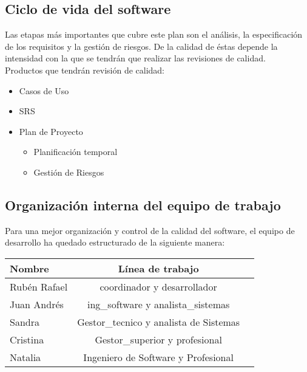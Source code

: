 \documentclass[11pt, a4paper, twoside, titlepage]{article}
\begin{document}
		\subsection{Ciclo de vida del software} %
			Las etapas más importantes que cubre este plan son el análisis, la especificación de los requisitos y la gestión de riesgos. De la calidad de éstas depende la intensidad con la que se tendrán que realizar las revisiones de calidad. %
 \\

			Productos que tendrán revisión de calidad: \\

				\begin{itemize}
					\item Casos de Uso
					\item SRS
					\item Plan de Proyecto
						\begin{itemize}
							\item Planificación temporal
							\item Gestión de Riesgos
						\end{itemize}
				\end{itemize}
				
		\subsection{Organización interna del equipo de trabajo}
			Para una mejor organización y control de la calidad del software, el equipo de desarrollo ha quedado estructurado de la siguiente manera:
			
			\begin{center}
				\begin{tabular}{| l | c | r |}
				\hline
				\bfseries Nombre 	& \bfseries Línea de trabajo			\\ \hline
				Rubén Rafael 		& \gls{coordinador} y \gls{desarrollador} 	\\ \hline
				Juan Andrés 		& \gls{ing_software} y \gls{analista_sistemas}	\\ \hline
				Sandra 			& \gls{Gestor_tecnico} y analista de Sistemas	\\ \hline
				Cristina 		& \gls{Gestor_superior} y \gls{profesional}	\\ \hline
				Natalia 		& Ingeniero de Software y Profesional		\\ \hline
				\end{tabular}
			\end{center}
			
\end{document}

